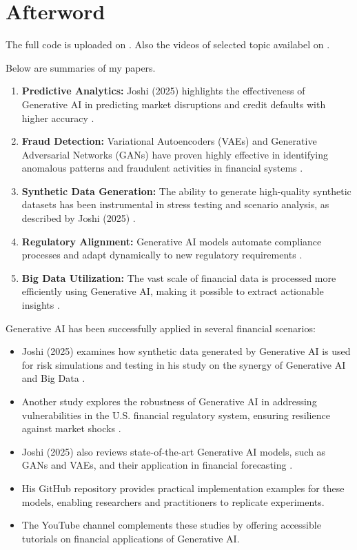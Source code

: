 \documentclass[a4paper,headinclude=on,footinclude=on,12pt,oneside]{scrbook}
\begin{document}
	
	
	\chapter*{Afterword}
	
	
	The full code is uploaded on \cite{JoshiGit2025}.
	Also the videos of selected topic availabel on \cite{JoshiYouTube2025}.
	
Below are summaries of my papers.

	\begin{enumerate}
		\item \textbf{Predictive Analytics:} Joshi (2025) highlights the effectiveness of Generative AI in predicting market disruptions and credit defaults with higher accuracy \cite{JoshiIJFMR2025}.
		\item \textbf{Fraud Detection:} Variational Autoencoders (VAEs) and Generative Adversarial Networks (GANs) have proven highly effective in identifying anomalous patterns and fraudulent activities in financial systems \cite{JoshiCSEIT2025}.
		\item \textbf{Synthetic Data Generation:} The ability to generate high-quality synthetic datasets has been instrumental in stress testing and scenario analysis, as described by Joshi (2025) \cite{JoshiIJIREM2025}.
		\item \textbf{Regulatory Alignment:} Generative AI models automate compliance processes and adapt dynamically to new regulatory requirements \cite{JoshiIJIREM2025}.
		\item \textbf{Big Data Utilization:} The vast scale of financial data is processed more efficiently using Generative AI, making it possible to extract actionable insights \cite{JoshiIJIREM2025}.
	\end{enumerate}
	
	Generative AI has been successfully applied in several financial scenarios:
	\begin{itemize}
		\item Joshi (2025) examines how synthetic data generated by Generative AI is used for risk simulations and testing in his study on the synergy of Generative AI and Big Data \cite{JoshiIJFMR2025}.
		\item Another study explores the robustness of Generative AI in addressing vulnerabilities in the U.S. financial regulatory system, ensuring resilience against market shocks \cite{JoshiIJIREM2025}.
		\item Joshi (2025) also reviews state-of-the-art Generative AI models, such as GANs and VAEs, and their application in financial forecasting \cite{JoshiCSEIT2025}.
		\item His GitHub repository \cite{JoshiGit2025} provides practical implementation examples for these models, enabling researchers and practitioners to replicate experiments.
		\item The YouTube channel \cite{JoshiYouTube2025} complements these studies by offering accessible tutorials on financial applications of Generative AI.
	\end{itemize}
	
\end{document}
